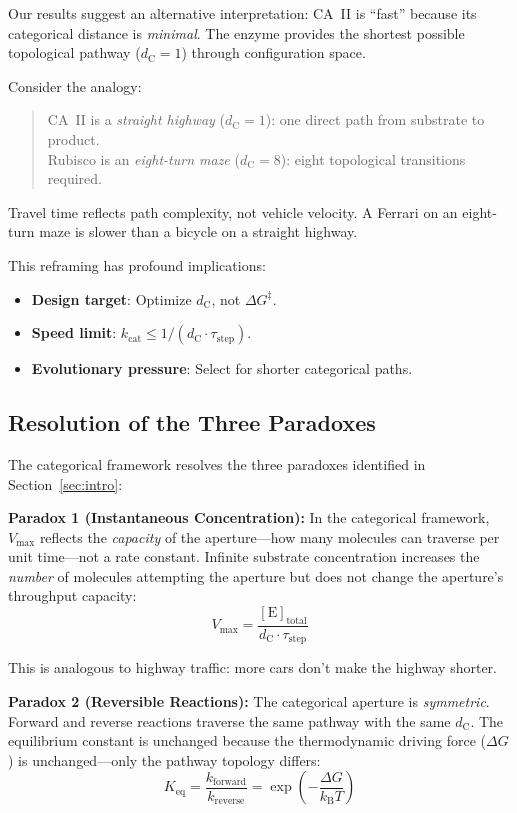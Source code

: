 \documentclass[twocolumn,amsmath,amssymb,aps,prb,superscriptaddress,longbibliography]{revtex4-2}
\newcommand{\dC}{d_{\mathrm{C}}}
\newcommand{\kcat}{k_{\mathrm{cat}}}
\newcommand{\kB}{k_{\mathrm{B}}}
\newcommand{\Vmax}{V_{\mathrm{max}}}
\newcommand{\DG}{\Delta G^{\ddagger}}
\begin{document}
Our results suggest an alternative interpretation: CA~II is ``fast'' because its categorical distance is \emph{minimal}. The enzyme provides the shortest possible topological pathway ($\dC = 1$) through configuration space.

Consider the analogy:
\begin{quote}
CA~II is a \emph{straight highway} ($\dC = 1$): one direct path from substrate to product.\\
Rubisco is an \emph{eight-turn maze} ($\dC = 8$): eight topological transitions required.
\end{quote}

Travel time reflects path complexity, not vehicle velocity. A Ferrari on an eight-turn maze is slower than a bicycle on a straight highway.

This reframing has profound implications:
\begin{itemize}
\item \textbf{Design target}: Optimize $\dC$, not $\DG$.
\item \textbf{Speed limit}: $\kcat \leq 1/(\dC \cdot \tau_{\text{step}})$.
\item \textbf{Evolutionary pressure}: Select for shorter categorical paths.
\end{itemize}

\subsection{Resolution of the Three Paradoxes}

The categorical framework resolves the three paradoxes identified in Section~\ref{sec:intro}:

\textbf{Paradox 1 (Instantaneous Concentration):} In the categorical framework, $\Vmax$ reflects the \emph{capacity} of the aperture---how many molecules can traverse per unit time---not a rate constant. Infinite substrate concentration increases the \emph{number} of molecules attempting the aperture but does not change the aperture's throughput capacity:
\begin{equation}
\Vmax = \frac{[\text{E}]_{\text{total}}}{\dC \cdot \tau_{\text{step}}}
\end{equation}

This is analogous to highway traffic: more cars don't make the highway shorter.

\textbf{Paradox 2 (Reversible Reactions):} The categorical aperture is \emph{symmetric}. Forward and reverse reactions traverse the same pathway with the same $\dC$. The equilibrium constant is unchanged because the thermodynamic driving force ($\Delta G$) is unchanged---only the pathway topology differs:
\begin{equation}
K_{\text{eq}} = \frac{k_{\text{forward}}}{k_{\text{reverse}}} = \exp\left(-\frac{\Delta G}{\kB T}\right)
\end{equation}
\end{document}

